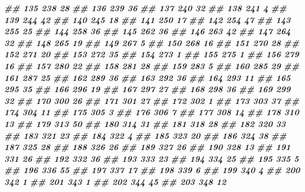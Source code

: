 \documentclass[
]{book}
\newenvironment{Shaded}{\begin{snugshade}}{\end{snugshade}}
\newcommand{\DocumentationTok}[1]{\textcolor[rgb]{0.56,0.35,0.01}{\textbf{\textit{#1}}}}
\theoremstyle{definition}
\theoremstyle{definition}
\theoremstyle{definition}
\theoremstyle{definition}
\theoremstyle{remark}
\begin{document}
\begin{Shaded}
\begin{Highlighting}[]
\DocumentationTok{\#\# 135    238 28}
\DocumentationTok{\#\# 136    239 36}
\DocumentationTok{\#\# 137    240 32}
\DocumentationTok{\#\# 138    241  4}
\DocumentationTok{\#\# 139    244 42}
\DocumentationTok{\#\# 140    245 18}
\DocumentationTok{\#\# 141    250 17}
\DocumentationTok{\#\# 142    254 47}
\DocumentationTok{\#\# 143    255 25}
\DocumentationTok{\#\# 144    258 36}
\DocumentationTok{\#\# 145    262 36}
\DocumentationTok{\#\# 146    263 42}
\DocumentationTok{\#\# 147    264 32}
\DocumentationTok{\#\# 148    265 19}
\DocumentationTok{\#\# 149    267  5}
\DocumentationTok{\#\# 150    268 16}
\DocumentationTok{\#\# 151    270 28}
\DocumentationTok{\#\# 152    271 20}
\DocumentationTok{\#\# 153    272 35}
\DocumentationTok{\#\# 154    273  1}
\DocumentationTok{\#\# 155    275  1}
\DocumentationTok{\#\# 156    279 16}
\DocumentationTok{\#\# 157    280 22}
\DocumentationTok{\#\# 158    281 28}
\DocumentationTok{\#\# 159    283  5}
\DocumentationTok{\#\# 160    285 29}
\DocumentationTok{\#\# 161    287 25}
\DocumentationTok{\#\# 162    289 36}
\DocumentationTok{\#\# 163    292 36}
\DocumentationTok{\#\# 164    293 11}
\DocumentationTok{\#\# 165    295 35}
\DocumentationTok{\#\# 166    296 19}
\DocumentationTok{\#\# 167    297 27}
\DocumentationTok{\#\# 168    298 36}
\DocumentationTok{\#\# 169    299 32}
\DocumentationTok{\#\# 170    300 26}
\DocumentationTok{\#\# 171    301 27}
\DocumentationTok{\#\# 172    302  1}
\DocumentationTok{\#\# 173    303 37}
\DocumentationTok{\#\# 174    304 11}
\DocumentationTok{\#\# 175    305  3}
\DocumentationTok{\#\# 176    306  7}
\DocumentationTok{\#\# 177    308 14}
\DocumentationTok{\#\# 178    310 13}
\DocumentationTok{\#\# 179    313 50}
\DocumentationTok{\#\# 180    314 31}
\DocumentationTok{\#\# 181    318 28}
\DocumentationTok{\#\# 182    320 33}
\DocumentationTok{\#\# 183    321 23}
\DocumentationTok{\#\# 184    322  4}
\DocumentationTok{\#\# 185    323 20}
\DocumentationTok{\#\# 186    324 38}
\DocumentationTok{\#\# 187    325 28}
\DocumentationTok{\#\# 188    326 26}
\DocumentationTok{\#\# 189    327 26}
\DocumentationTok{\#\# 190    328 13}
\DocumentationTok{\#\# 191    331 26}
\DocumentationTok{\#\# 192    332 36}
\DocumentationTok{\#\# 193    333 23}
\DocumentationTok{\#\# 194    334 25}
\DocumentationTok{\#\# 195    335  5}
\DocumentationTok{\#\# 196    336 55}
\DocumentationTok{\#\# 197    337 17}
\DocumentationTok{\#\# 198    339  6}
\DocumentationTok{\#\# 199    340  4}
\DocumentationTok{\#\# 200    342  1}
\DocumentationTok{\#\# 201    343  1}
\DocumentationTok{\#\# 202    344 45}
\DocumentationTok{\#\# 203    348 12}

\end{Highlighting}
\end{Shaded}
\end{document}

